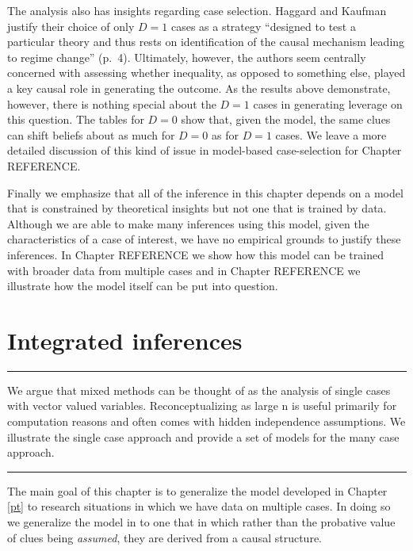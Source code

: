 \documentclass[12pt,]{book}
\begin{document}
The analysis also has insights regarding case selection. Haggard and Kaufman justify their choice of only \(D=1\) cases as a strategy ``designed to test a particular theory and thus rests on identification of the causal mechanism leading to regime change'' (p.~4). Ultimately, however, the authors seem centrally concerned with assessing whether inequality, as opposed to something else, played a key causal role in generating the outcome. As the results above demonstrate, however, there is nothing special about the \(D=1\) cases in generating leverage on this question. The tables for \(D=0\) show that, given the model, the same clues can shift beliefs about as much for \(D=0\) as for \(D=1\) cases. We leave a more detailed discussion of this kind of issue in model-based case-selection for Chapter REFERENCE.

Finally we emphasize that all of the inference in this chapter depends on a model that is constrained by theoretical insights but not one that is trained by data. Although we are able to make many inferences using this model, given the characteristics of a case of interest, we have no empirical grounds to justify these inferences. In Chapter REFERENCE we show how this model can be trained with broader data from multiple cases and in Chapter REFERENCE we illustrate how the model itself can be put into question.

\hypertarget{mixing}{%
\chapter{Integrated inferences}\label{mixing}}

\begin{center}\rule{0.5\linewidth}{\linethickness}\end{center}

We argue that mixed methods can be thought of as the analysis of single cases with vector valued variables. Reconceptualizing as large n is useful primarily for computation reasons and often comes with hidden independence assumptions. We illustrate the single case approach and provide a set of models for the many case approach.

\begin{center}\rule{0.5\linewidth}{\linethickness}\end{center}

The main goal of this chapter is to generalize the model developed in Chapter \ref{pt} to research situations in which we have data on multiple cases. In doing so we generalize the model in \citet{humphreys2015mixing} to one that in which rather than the probative value of clues being \emph{assumed}, they are derived from a causal structure.
\end{document}
